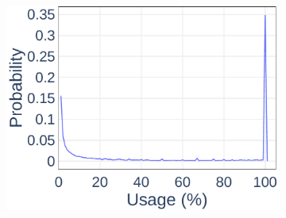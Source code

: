 \begin{figure}[ht]
\begin{subfigure}[b]{0.3\textwidth}
    \includegraphics[width=\textwidth]{Figures/Data-UsagePct-PDF}
  \end{subfigure}
	\vspace*{1em}


\end{figure}
